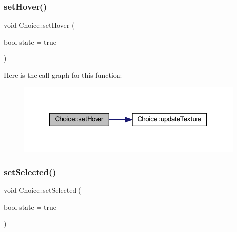 \subsubsection{\texorpdfstring{set\+Hover()}{setHover()}}
{\footnotesize\ttfamily void Choice\+::set\+Hover (\begin{DoxyParamCaption}\item[{bool}]{state = {\ttfamily true} }\end{DoxyParamCaption})}

Here is the call graph for this function\+:\nopagebreak
\begin{figure}[H]
\begin{center}
\leavevmode
\includegraphics[width=320pt]{class_choice_a377e5d456c5c7c7e8914af52cf184a3a_cgraph}
\end{center}
\end{figure}
\mbox{\label{class_choice_aa4bbe520ca9f933327fc1f678d6626f8}} 
\subsubsection{\texorpdfstring{set\+Selected()}{setSelected()}}
{\footnotesize\ttfamily void Choice\+::set\+Selected (\begin{DoxyParamCaption}\item[{bool}]{state = {\ttfamily true} }\end{DoxyParamCaption})}


